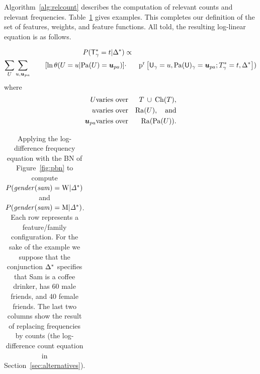 \documentclass[runningheads,a4paper]{llncs}
\begin{document}
%

Algorithm~\ref{alg:relcount} describes the computation of relevant counts and relevant frequencies. Table~\ref{table:log-diff-example} gives examples. 
This completes our definition of the set of features, weights, and feature functions. All told, the resulting log-linear equation is as follows.





\begin{definition}\label{def:log-diff-freq-eq}
\begin{eqnarray*}
  \Gprob{\FG{\Ground{\TI}} = \TV} {\QC} &\propto &  \\
 \sum_{\UT} \sum_{\UV,\Prange{\UT}}   
\qquad \left[ \ln \cprob{\UT = \UV}{\Pa{\UT} = \Prange{\UT}} \right] &
    \cdot &
    \Relfreq{\Appendterm{\Ground{\UI}  = \UV} {\Ground{\Pa{\UI}} = \Prange{\UT}}} {\Qconj})
\end{eqnarray*}
where 
\begin{eqnarray*}
\UT &\mbox{varies over} &  \Setaddterm{\TT} {\Ch{\TT}}, \\
\UV & \mbox{varies over} & \Range{\UT}, \quad\mbox{and}\\
\Prange{\UT} & \mbox{varies over} &  \Range{\Pa{\UT}}.
\end{eqnarray*}
\end{definition}


\begin{table}

\begin{tabular}{lrlrrrr|rr}

\end{tabular}
\caption{Applying the log-difference frequency equation with the BN of Figure~\ref{fig:pbn} to compute $P(\it{gender}(sam) = \mathrm{W} | \Delta^{*}\hspace{0.0ex})$ and $P(\it{gender}(sam) = \mathrm{M} | \Delta^{*}\hspace{0.0ex})$. Each row represents a feature/family configuration. For the sake of the example we suppose that the conjunction $\Delta^{*}\hspace{0.0ex}$ specifies that Sam is a coffee drinker, has 60 male friends, and 40 female friends.
The last two columns show the result of replacing frequencies by counts (the log-difference count equation in Section~\ref{sec:alternatives}).}
\label{table:log-diff-example}
\end{table}
\end{document}
